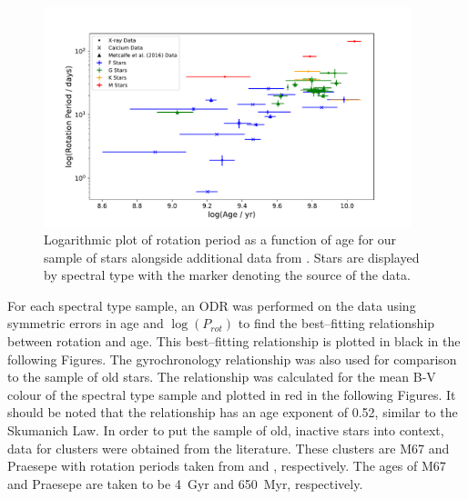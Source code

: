 \begin{figure}[!ht]
    \centering
    \includegraphics[width=0.95\textwidth]{Figures/5-Activity_rotation/prot_v_age.pdf}
    \caption[Rotation period as a function of age for full sample]{Logarithmic plot of rotation period as a function of age for our sample of stars alongside additional data from \citet{Metcalfe_etal_2016}. Stars are displayed by spectral type with the marker denoting the source of the data.}
    \label{fig:full_sample_prot_v_age}
\end{figure}

For each spectral type sample, an ODR was performed on the data using symmetric errors in age and $\log(P_{rot})$ to find the best--fitting relationship between rotation and age. This best--fitting relationship is plotted in black in the following Figures. The \citet{Barnes_2007} gyrochronology relationship was also used for comparison to the sample of old stars. The \citet{Barnes_2007} relationship was calculated for the mean B-V colour of the spectral type sample and plotted in red in the following Figures. It should be noted that the \citet{Barnes_2007} relationship has an age exponent of 0.52, similar to the Skumanich Law. In order to put the sample of old, inactive stars into context, data for clusters were obtained from the literature. These clusters are M67 and Praesepe with rotation periods taken from \citet{Barnes_etal_2016} and \citet{Douglas_etal_2017}, respectively. The ages of M67 and Praesepe are taken to be 4~Gyr and 650~Myr, respectively.

